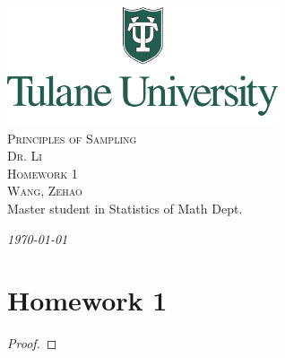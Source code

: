 \documentclass[12pt]{article}
\newcommand{\CN}{Principles of Sampling}
\newcommand{\Ti}{Homework 1}
\newcommand{\Pf}{Dr. Li}
\newcommand{\FN}{Zehao}
\newcommand{\LN}{Wang}
\begin{document}
\begin{titlepage}
    \begin{center}    
    \includegraphics[width=0.6\textwidth]{Tulane.png}\\[1cm]    
    
    \textsc{\Huge \CN}\\[0.5cm]
    \textsc{\large \Pf}\\[1.0cm]
    
    \textsc{\LARGE \Ti}\\[0.5cm]
    \textsc{\large \LN, \FN}\\
    {Master student in Statistics of Math Dept.}
    
    
    \vfill
    
    {\Large \emph{\today}}
    
    \end{center}
\end{titlepage}
    
    \setcounter{section}{1}    

    \section*{\Ti}

    \begin{exercise}
        
    \end{exercise}

    \begin{proof}
        
    \end{proof}
\end{document}
